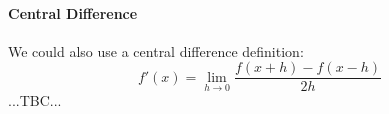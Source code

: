 
\paragraph{Central Difference} 
We could also use a central difference definition:
\begin{equation}
 f'(x) = \lim_{h \rightarrow 0} \frac{f(x+h) - f(x-h)}{2 h}
\end{equation}
...TBC...


